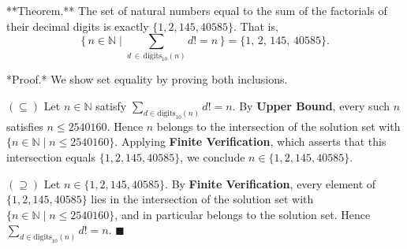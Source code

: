 **Theorem.** The set of natural numbers equal to the sum of the factorials of their decimal digits is exactly $\{1, 2, 145, 40585\}$. That is,
$$\{\, n \in \mathbb{N} \mid \sum_{d \,\in\, \mathrm{digits}_{10}(n)} d! = n \,\} = \{1,\, 2,\, 145,\, 40585\}.$$

*Proof.* We show set equality by proving both inclusions.

$(\subseteq)$ Let $n \in \mathbb{N}$ satisfy $\sum_{d \in \mathrm{digits}_{10}(n)} d! = n$. By \textbf{Upper Bound}, every such $n$ satisfies $n \leq 2540160$. Hence $n$ belongs to the intersection of the solution set with $\{n \in \mathbb{N} \mid n \leq 2540160\}$. Applying \textbf{Finite Verification}, which asserts that this intersection equals $\{1, 2, 145, 40585\}$, we conclude $n \in \{1, 2, 145, 40585\}$.

$(\supseteq)$ Let $n \in \{1, 2, 145, 40585\}$. By \textbf{Finite Verification}, every element of $\{1, 2, 145, 40585\}$ lies in the intersection of the solution set with $\{n \in \mathbb{N} \mid n \leq 2540160\}$, and in particular belongs to the solution set. Hence $\sum_{d \in \mathrm{digits}_{10}(n)} d! = n$. $\blacksquare$